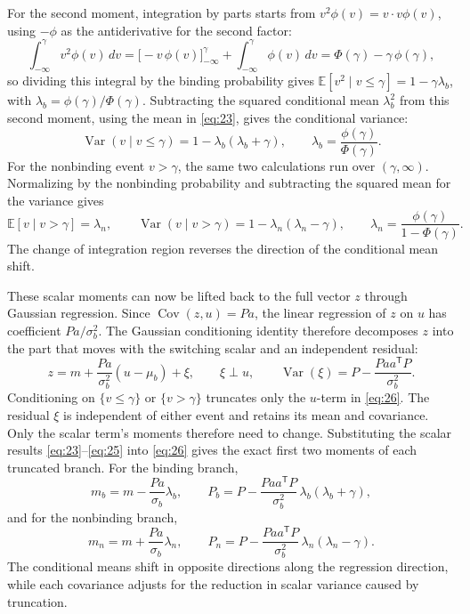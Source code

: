 \documentclass[11pt]{article}
\begin{document}
For the second moment, integration by parts starts from $v^2\phi(v)=v\cdot v\phi(v)$, using $-\phi$ as the antiderivative for the second factor:
\[
 \int_{-\infty}^{\gamma}v^2\phi(v)\,dv
 =\bigl[-v\,\phi(v)\bigr]_{-\infty}^{\gamma}
  +\int_{-\infty}^{\gamma}\phi(v)\,dv
 =\Phi(\gamma)-\gamma\,\phi(\gamma),
\]
so dividing this integral by the binding probability gives $\mathbb E[v^2\mid v\leq\gamma]=1-\gamma\lambda_b$, with $\lambda_b=\phi(\gamma)/\Phi(\gamma)$. Subtracting the squared conditional mean $\lambda_b^2$ from this second moment, using the mean in \eqref{eq:23}, gives the conditional variance:
\begin{equation}\label{eq:24}
 \operatorname{Var}(v\mid v\leq\gamma)
 =1-\lambda_b(\lambda_b+\gamma),
 \qquad
 \lambda_b=\frac{\phi(\gamma)}{\Phi(\gamma)}.
\end{equation}
For the nonbinding event $v>\gamma$, the same two calculations run over $(\gamma,\infty)$. Normalizing by the nonbinding probability and subtracting the squared mean for the variance gives
\begin{equation}\label{eq:25}
 \mathbb E[v\mid v>\gamma]=\lambda_n,
 \qquad
 \operatorname{Var}(v\mid v>\gamma)
 =1-\lambda_n(\lambda_n-\gamma),
 \qquad
 \lambda_n=\frac{\phi(\gamma)}{1-\Phi(\gamma)}.
\end{equation}
The change of integration region reverses the direction of the conditional mean shift.

These scalar moments can now be lifted back to the full vector $z$ through Gaussian regression. Since $\operatorname{Cov}(z,u)=Pa$, the linear regression of $z$ on $u$ has coefficient $Pa/\sigma_b^2$. The Gaussian conditioning identity therefore decomposes $z$ into the part that moves with the switching scalar and an independent residual:
\begin{equation}\label{eq:26}
 z=m+\frac{Pa}{\sigma_b^2}(u-\mu_b)+\xi,
 \qquad
 \xi\perp u,
 \qquad
 \operatorname{Var}(\xi)=P-\frac{Paa^{\mathsf T}P}{\sigma_b^2}.
\end{equation}
Conditioning on $\{v\leq\gamma\}$ or $\{v>\gamma\}$ truncates only the $u$-term in \eqref{eq:26}. The residual $\xi$ is independent of either event and retains its mean and covariance. Only the scalar term's moments therefore need to change. Substituting the scalar results \eqref{eq:23}--\eqref{eq:25} into \eqref{eq:26} gives the exact first two moments of each truncated branch. For the binding branch,
\begin{equation}\label{eq:27}
 m_b=m-\frac{Pa}{\sigma_b}\lambda_b,
 \qquad
 P_b=P-\frac{Paa^{\mathsf T}P}{\sigma_b^2}\,
             \lambda_b(\lambda_b+\gamma),
\end{equation}
and for the nonbinding branch,
\begin{equation}\label{eq:28}
 m_n=m+\frac{Pa}{\sigma_b}\lambda_n,
 \qquad
 P_n=P-\frac{Paa^{\mathsf T}P}{\sigma_b^2}\,
             \lambda_n(\lambda_n-\gamma).
\end{equation}
The conditional means shift in opposite directions along the regression direction, while each covariance adjusts for the reduction in scalar variance caused by truncation.
\end{document}
